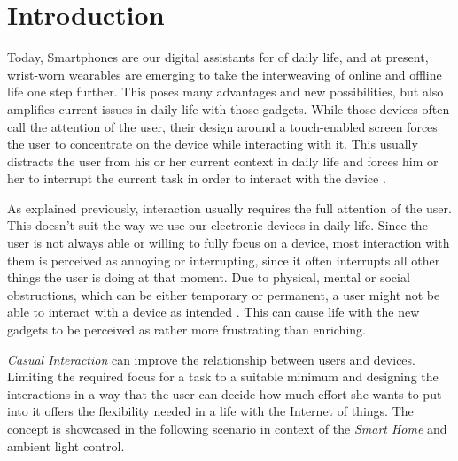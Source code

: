 \chapter{Introduction}
\label{sec:intro}
Today, Smartphones are our digital assistants for of daily life, and at present, wrist-worn wearables are emerging to take the interweaving of online and offline life one step further. This poses many advantages and new possibilities, but also amplifies current issues in daily life with those gadgets. While those devices often call the attention of the user, their design around a touch-enabled screen forces the user to concentrate on the device while interacting with it. This usually distracts the user from his or her current context in daily life and forces him or her to interrupt the current task in order to interact with the device \cite{Pohl2013}.

As explained previously, interaction usually requires the full attention of the user. This doesn't suit the way we use our electronic devices in daily life. Since the user is not always able or willing to fully focus on a device, most interaction with them is perceived as annoying or interrupting, since it often interrupts all other things the user is doing at that moment. Due to physical, mental or social obstructions, which can be either temporary or permanent, a user might not be able to interact with a device as intended \cite{Pohl2013}. This can cause life with the new gadgets to be perceived as rather more frustrating than enriching.

\textit{Casual Interaction} can improve the relationship between users and devices. Limiting the required focus for a task to a suitable minimum and designing the interactions in a way that the user can decide how much effort she wants to put into it offers the flexibility needed in a life with the Internet of things. The concept is showcased in the following scenario in context of the \textit{Smart Home} and ambient light control.

